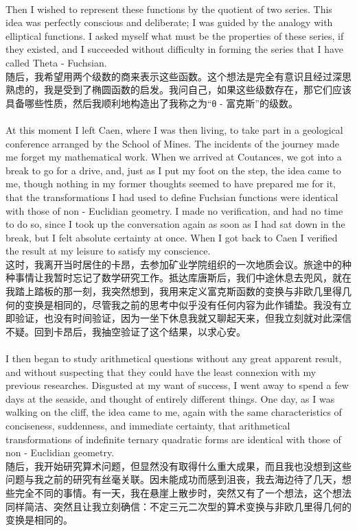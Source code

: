 \documentclass{article}
\begin{document}
\\
Then I wished to represent these functions by the quotient of two series. This idea was perfectly conscious and deliberate; I was guided by the analogy with elliptical functions. I asked myself what must be the properties of these series, if they existed, and I succeeded without difficulty in forming the series that I have called Theta - Fuchsian.\\
随后，我希望用两个级数的商来表示这些函数。这个想法是完全有意识且经过深思熟虑的，我是受到了椭圆函数的启发。我问自己，如果这些级数存在，那它们应该具备哪些性质，然后我顺利地构造出了我称之为“θ - 富克斯”的级数。 \\

\\
At this moment I left Caen, where I was then living, to take part in a geological conference arranged by the School of Mines. The incidents of the journey made me forget my mathematical work. When we arrived at Coutances, we got into a break to go for a drive, and, just as I put my foot on the step, the idea came to me, though nothing in my former thoughts seemed to have prepared me for it, that the transformations I had used to define Fuchsian functions were identical with those of non - Euclidian geometry. I made no verification, and had no time to do so, since I took up the conversation again as soon as I had sat down in the break, but I felt absolute certainty at once. When I got back to Caen I verified the result at my leisure to satisfy my conscience.\\
这时，我离开当时居住的卡昂，去参加矿业学院组织的一次地质会议。旅途中的种种事情让我暂时忘记了数学研究工作。抵达库唐斯后，我们中途休息去兜风，就在我踏上踏板的那一刻，我突然想到，我用来定义富克斯函数的变换与非欧几里得几何的变换是相同的，尽管我之前的思考中似乎没有任何内容为此作铺垫。我没有立即验证，也没有时间验证，因为一坐下休息我就又聊起天来，但我立刻就对此深信不疑。回到卡昂后，我抽空验证了这个结果，以求心安。\\ 

\\
I then began to study arithmetical questions without any great apparent result, and without suspecting that they could have the least connexion with my previous researches. Disgusted at my want of success, I went away to spend a few days at the seaside, and thought of entirely different things. One day, as I was walking on the cliff, the idea came to me, again with the same characteristics of conciseness, suddenness, and immediate certainty, that arithmetical transformations of indefinite ternary quadratic forms are identical with those of non - Euclidian geometry.\\
随后，我开始研究算术问题，但显然没有取得什么重大成果，而且我也没想到这些问题与我之前的研究有丝毫关联。因未能成功而感到沮丧，我去海边待了几天，想些完全不同的事情。有一天，我在悬崖上散步时，突然又有了一个想法，这个想法同样简洁、突然且让我立刻确信：不定三元二次型的算术变换与非欧几里得几何的变换是相同的。 \\
\end{document}
